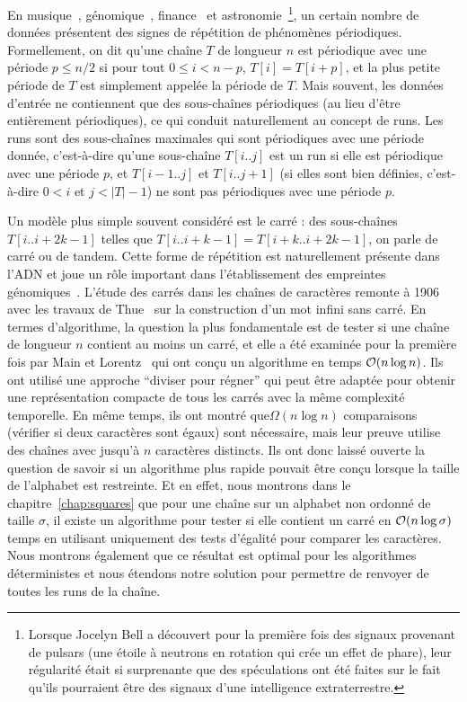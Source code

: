 En musique~\cite{arom1989time}, génomique~\cite{pich2018somatic}, finance~\cite{harvey2007trends} et astronomie~\cite{hewish1979observation}\footnote{ Lorsque Jocelyn Bell a découvert pour la première fois des signaux provenant de pulsars (une étoile à neutrons en rotation qui crée un effet de phare), leur régularité était si surprenante que des spéculations ont été faites sur le fait qu'ils pourraient être des signaux d'une intelligence extraterrestre. }, un certain nombre de données présentent des signes de répétition de phénomènes périodiques.
Formellement, on dit qu'une chaîne $T$ de longueur $n$ est périodique avec une période $p \leq n/2$ si pour tout $0 \leq i < n - p$, $T[i]=T[i+p]$, et la plus petite période de $T$ est simplement appelée la période de $T$.
%
Mais souvent, les données d'entrée ne contiennent que des sous-chaînes périodiques (au lieu d'être entièrement périodiques), ce qui conduit naturellement au concept de runs. Les runs sont des sous-chaînes maximales qui sont périodiques avec une période donnée, c'est-à-dire qu'une sous-chaîne $T[i..j]$ est un run si elle est périodique avec une période $p$, et $T[i-1..j]$ et $T[i..j+1]$ (si elles sont bien définies, c'est-à-dire $0<i$ et $j<|T|-1$) ne sont pas périodiques avec une période $p$. 

Un modèle plus simple souvent considéré est le carré : des sous-chaînes $T[i..i+2k-1]$ telles que $T[i..i+k-1]=T[i+k..i+2k-1]$, on parle de carré ou de tandem. Cette forme de répétition est naturellement présente dans l'ADN et joue un rôle important dans l'établissement des empreintes génomiques~\cite{Kolpakov2003,GYMREK20179}. 
%
L'étude des carrés dans les chaînes de caractères remonte à 1906 avec les travaux de Thue~\cite{thue1906} sur la construction d'un mot infini sans carré. En termes d'algorithme, la question la plus fondamentale est de tester si une chaîne de longueur $n$ contient au moins un carré, et elle a été examinée pour la première fois par Main et Lorentz~\cite{Main1984} qui ont conçu un algorithme en temps $\mathcal{O}(n \log n)$. Ils ont utilisé une approche ``diviser pour régner'' qui peut être adaptée pour obtenir une représentation compacte de tous les carrés avec la même complexité temporelle. En même temps, ils ont montré que$\Omega(n\log n)$ comparaisons (vérifier si deux caractères sont égaux) sont nécessaire, mais leur preuve utilise des chaînes avec jusqu'à $n$ caractères distincts. Ils ont donc laissé ouverte la question de savoir si un algorithme plus rapide pouvait être conçu lorsque la taille de l'alphabet est restreinte.  
Et en effet, nous montrons dans le chapitre~\ref{chap:squares} que pour une chaîne sur un alphabet non ordonné de taille $\sigma$, il existe un algorithme pour tester si elle contient un carré en $\mathcal{O}(n\log \sigma)$ temps en utilisant uniquement des tests d'égalité pour comparer les caractères. Nous montrons également que ce résultat est optimal pour les algorithmes déterministes et nous étendons notre solution pour permettre de renvoyer de toutes les runs de la chaîne.

